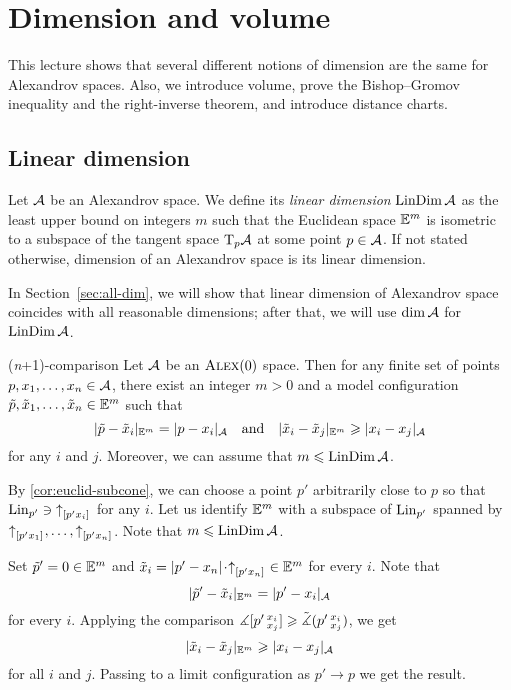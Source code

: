 \chapter{Dimension and volume}\label{chap:dim}

This lecture shows that several different notions of dimension are the same for Alexandrov spaces.
Also, we introduce volume, prove the Bishop--Gromov inequality and the right-inverse theorem, and introduce distance charts.

\section{Linear dimension}

Let $\mathcal{A}$ be an Alexandrov space.
We define its \emph{linear dimension} $\mathop{\rm LinDim}\nolimits \mathcal{A}$ as the least upper bound on integers $m$ such that
the Euclidean space $\mathbb{E}^m$ is isometric to a subspace of the tangent space $\mathrm{T}_p\mathcal{A}$ at some point $p\in \mathcal{A}$.
If not stated otherwise, dimension of an Alexandrov space is its linear dimension.

In Section~\ref{sec:all-dim}, we will show that linear dimension of Alexandrov space coincides with all reasonable dimensions;
after that, we will use $\operatorname{\rm dim}\nolimits\mathcal{A}$ for $\mathop{\rm LinDim}\nolimits\mathcal{A}$.

\begin{thm}{(\textit{n}+1)-comparison}\label{thm:n+1}
Let $\mathcal{A}$ be an $\textsc{Alex}(0)$ space.
Then for any finite set of points $p,x_1,\dots,x_n\in \mathcal{A}$, there exist an integer $m>0$ and a model configuration 
$\tilde p,\tilde x_1,\dots,\tilde x_n\in \mathbb{E}^m$ such that 
\[|\tilde p-\tilde x_i|_{\mathbb{E}^m}=| p- x_i|_{\mathcal{A}}
\quad\text{and}\quad
|\tilde x_i-\tilde x_j|_{\mathbb{E}^m}\geqslant |x_i- x_j|_{\mathcal{A}}\]
for any $i$ and $j$.
Moreover, we can assume that $m\leqslant \mathop{\rm LinDim}\nolimits\mathcal{A}$. 
\end{thm}

By \ref{cor:euclid-subcone}, we can choose a point $p'$ arbitrarily close to $p$ so that 
$\mathop{\rm Lin}\nolimits_{p'}\ni {\uparrow}_{[{p'}{x_i}]_{{}}}$ for any $i$.
Let us identify $\mathbb{E}^m$ with a subspace of $\mathop{\rm Lin}\nolimits_{p'}$ spanned by ${\uparrow}_{[{p'}{x_1}]_{{}}},\dots,{\uparrow}_{[{p'}{x_n}]_{{}}}$.
Note that $m\leqslant \mathop{\rm LinDim}\nolimits\mathcal{A}$.

Set $\tilde p'=0\in \mathbb{E}^m$ and $\tilde x_i=\dist{p'}{x_n}{}\cdot\dir{p'}{x_n}\in \EE^m$ for every $i$.
Note that 
\[|\tilde p'-\tilde x_i|_{\mathbb{E}^m}=| p'- x_i|_{\mathcal{A}}\]
for every $i$.
Applying the comparison $\measuredangle[p'\,{}^{x_i}_{x_j}]\geqslant \tilde\measuredangle(p'\,{}^{x_i}_{x_j})$, we get
\[|\tilde x_i-\tilde x_j|_{\mathbb{E}^m}\geqslant |x_i- x_j|_{\mathcal{A}}\]
for all $i$ and $j$.
Passing to a limit configuration as $p'\to p$ we get the result.
\qeds

